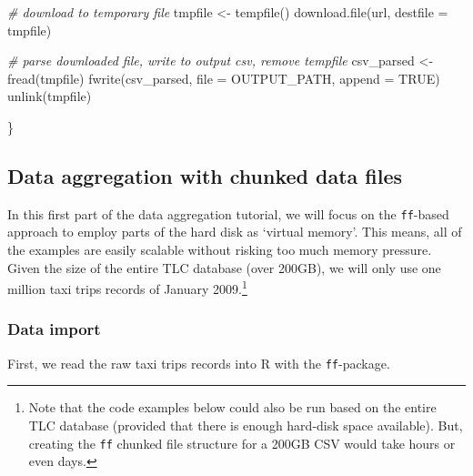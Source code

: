 \documentclass[
  12pt,
]{style/krantz}
\newenvironment{Shaded}{\begin{snugshade}}{\end{snugshade}}
\newcommand{\AttributeTok}[1]{\textcolor[rgb]{0.77,0.63,0.00}{#1}}
\newcommand{\CommentTok}[1]{\textcolor[rgb]{0.56,0.35,0.01}{\textit{#1}}}
\newcommand{\ConstantTok}[1]{\textcolor[rgb]{0.00,0.00,0.00}{#1}}
\newcommand{\FunctionTok}[1]{\textcolor[rgb]{0.00,0.00,0.00}{#1}}
\newcommand{\NormalTok}[1]{#1}
\newcommand{\OtherTok}[1]{\textcolor[rgb]{0.56,0.35,0.01}{#1}}
\begin{document}
\begin{Shaded}
\begin{Highlighting}[]
     \CommentTok{\# download to temporary file}
\NormalTok{     tmpfile }\OtherTok{\textless{}{-}} \FunctionTok{tempfile}\NormalTok{()}
     \FunctionTok{download.file}\NormalTok{(url, }\AttributeTok{destfile =}\NormalTok{ tmpfile)}
     
     \CommentTok{\# parse downloaded file, write to output csv, remove tempfile}
\NormalTok{     csv\_parsed }\OtherTok{\textless{}{-}} \FunctionTok{fread}\NormalTok{(tmpfile)}
     \FunctionTok{fwrite}\NormalTok{(csv\_parsed,}
            \AttributeTok{file =}\NormalTok{  OUTPUT\_PATH,}
            \AttributeTok{append =} \ConstantTok{TRUE}\NormalTok{)}
     \FunctionTok{unlink}\NormalTok{(tmpfile)}
     
\NormalTok{\}}
\end{Highlighting}
\end{Shaded}

\hypertarget{data-aggregation-with-chunked-data-files}{%
\subsection{Data aggregation with chunked data files}\label{data-aggregation-with-chunked-data-files}}

In this first part of the data aggregation tutorial, we will focus on the \texttt{ff}-based approach to employ parts of the hard disk as `virtual memory'. This means, all of the examples are easily scalable without risking too much memory pressure. Given the size of the entire TLC database (over 200GB), we will only use one million taxi trips records of January 2009.\footnote{Note that the code examples below could also be run based on the entire TLC database (provided that there is enough hard-disk space available). But, creating the \texttt{ff} chunked file structure for a 200GB CSV would take hours or even days.}

\hypertarget{data-import-1}{%
\subsubsection{Data import}\label{data-import-1}}

First, we read the raw taxi trips records into R with the \texttt{ff}-package.
\end{document}
